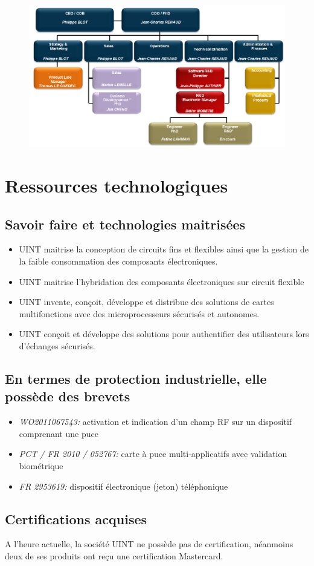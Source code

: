 \begin{figure}[!htbp]
  \centering
    \includegraphics[scale=0.6]{images/rh}
\end{figure}

\section{Ressources technologiques}

\subsection{Savoir faire et technologies maitrisées}

\begin{itemize}
\item UINT maitrise la conception de circuits fins et flexibles ainsi que la gestion de la faible consommation des composants électroniques.
\item UINT maitrise l'hybridation des composants électroniques sur circuit flexible
\item UINT invente, conçoit, développe et distribue des solutions de cartes multifonctions avec des microprocesseurs sécurisés et autonomes.
\item UINT conçoit et développe des solutions pour authentifier des utilisateurs lors d’échanges sécurisés.
\end{itemize}

\subsection{En termes de protection industrielle, elle possède des brevets}

\begin{itemize}
\item \textit{WO2011067543:} activation et indication d’un champ RF sur un dispositif comprenant une puce
\item \textit{PCT / FR 2010 / 052767:} carte à puce multi-applicatifs avec validation biométrique
\item \textit{FR 2953619:} dispositif électronique (jeton) téléphonique
\end{itemize}

\subsection{Certifications acquises}

A l’heure actuelle, la société UINT ne possède pas de certification, néanmoins deux de ses produits ont reçu une certification Mastercard.


